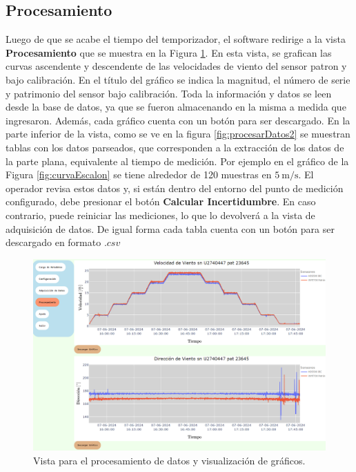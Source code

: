 \subsection{Procesamiento}\label{sec:ProcesamientoDatos}
Luego de que se acabe el tiempo del temporizador, el software redirige a la vista \textbf{Procesamiento} que se muestra en la Figura \ref{fig:procesarDatos1}. En esta vista, se grafican las curvas ascendente y descendente de las velocidades de viento del sensor patron y bajo calibración. En el título del gráfico se indica la magnitud, el número de serie y patrimonio del sensor bajo calibración. Toda la información y datos se leen desde la base de datos, ya que se fueron almacenando en la misma a medida que ingresaron. Además, cada gráfico cuenta con un botón para ser descargado. En la parte inferior de la vista, como se ve en la figura \ref{fig:procesarDatos2} se muestran tablas con los datos parseados, que corresponden a la extracción de los datos de la parte plana, equivalente al tiempo de medición. Por ejemplo en el gráfico de la Figura \ref{fig:curvaEscalon} se tiene alrededor de 120 muestras en $\SI{5}{\meter\per\second}$. El operador revisa estos datos y, si están dentro del entorno del punto de medición configurado, debe presionar el botón \textbf{Calcular Incertidumbre}. En caso contrario, puede reiniciar las mediciones, lo que lo devolverá a la vista de adquisición de datos. De igual forma cada tabla cuenta con un botón para ser descargado en formato $.csv$

\begin{figure}[H]
    \centering
    \includegraphics[width=1\linewidth]{Figuras/AplicacionWeb/frontend/procesarDatos1.png}
    \caption{Vista para el procesamiento de datos y visualización de gráficos.}
    \label{fig:procesarDatos1}
\end{figure}

